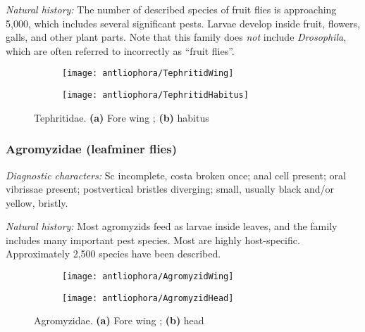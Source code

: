 \noindent{}\textit{Natural history:} The number of described species of fruit flies is approaching 5,000, which includes several significant pests. Larvae develop inside fruit, flowers, galls, and other plant parts. Note that this family does \textit{not} include \textit{Drosophila}, which are often referred to incorrectly as ``fruit flies''. 

\begin{figure}[ht!]
    \centering
    \begin{subfigure}[ht!]{0.45\textwidth}
        \texttt{[image: antliophora/TephritidWing]}
        \caption{}
        \label{fig:tephritid1}
    \end{subfigure}
    \qquad
    \begin{subfigure}[ht!]{0.4\textwidth}
        \texttt{[image: antliophora/TephritidHabitus]}
        \caption{}
        \label{fig:tephritid2}
    \end{subfigure}
    \caption{Tephritidae. \textbf{(a)} Fore wing \citep[][Fig. 4.56]{mcalpine1981manual}; \textbf{(b)} habitus \citep[][Fig. 66.1]{mcalpine1981manualv2}}\label{fig:tephritids}
\end{figure}

\subsubsection{Agromyzidae (leafminer flies)}
\noindent{}\textit{Diagnostic characters:} Sc incomplete, costa broken once; anal cell present; oral vibrissae present; postvertical bristles diverging; small, usually black and/or yellow, bristly.\vspace{3mm}

\noindent{}\textit{Natural history:} Most agromyzids feed as larvae inside leaves, and the family includes many important pest species. Most are highly host-specific. Approximately 2,500 species have been described.

\begin{figure}[ht!]
    \centering
    \begin{subfigure}[ht!]{0.45\textwidth}
        \texttt{[image: antliophora/AgromyzidWing]}
        \caption{}
        \label{fig:agromyzid1}
    \end{subfigure}
    \qquad
    \begin{subfigure}[ht!]{0.3\textwidth}
        \texttt{[image: antliophora/AgromyzidHead]}
        \caption{}
        \label{fig:agromyzid2}
    \end{subfigure}
    \caption{Agromyzidae. \textbf{(a)} Fore wing \citep[][Fig. 73.9]{mcalpine1981manualv2}; \textbf{(b)} head \citep[][Fig. 73.2]{mcalpine1981manualv2}}\label{fig:agromyzids}
\end{figure}

